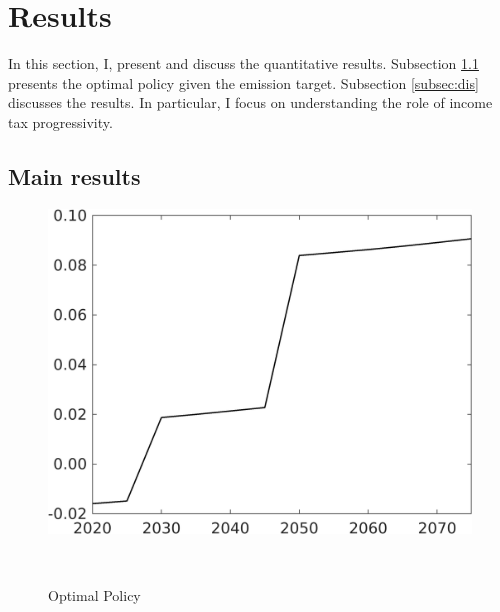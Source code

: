 \section{Results}

In this section, I, present and discuss the quantitative results.
Subsection \ref{subsec:mr} presents the optimal policy given the emission target. Subsection \ref{subsec:dis} discusses the results. In particular, I focus on understanding the role of income tax progressivity. 

\subsection{Main results}\label{subsec:mr}
\begin{figure}[h!!]
	\centering
	\caption{Optimal Policy }\label{fig:optPol}
	\begin{minipage}[]{0.4\textwidth}
		\includegraphics[width=1\textwidth]{../../codding_model/own_basedOnFried/optimalPol_elastS_DisuSci/figures/all_1705/Single_OPT_T_NoTaus_taul_spillover0_sep1_BN0_ineq0_etaa0.79.png}
	\end{minipage}
\begin{minipage}[]{0.1\textwidth}
\
\end{minipage}
	\begin{minipage}[]{0.4\textwidth}

\end{minipage}
\end{figure}
